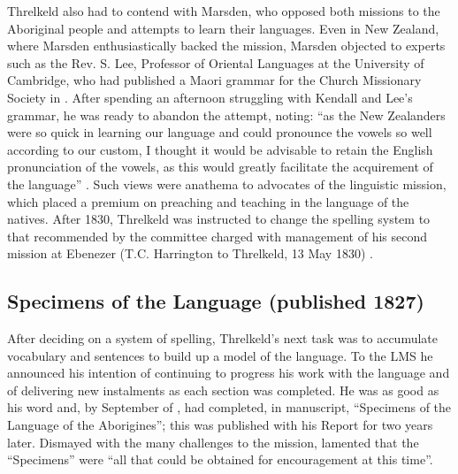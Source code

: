 {Threlkeld also had to contend with Marsden, who opposed both missions to the Aboriginal people and attempts to learn their languages. Even in New Zealand, where Marsden enthusiastically backed the mission, Marsden objected to experts such as the Rev. S. Lee, Professor of Oriental Languages at the University of Cambridge, who had published a Maori grammar for the Church Missionary Society in \citeyear{lee_grammar_1820} \citep{lee_grammar_1820}. After spending an afternoon struggling with Kendall and Lee’s grammar, he was ready to abandon the attempt, noting: “as the New Zealanders were so quick in learning our language and could pronounce the vowels so well according to our custom, I thought it would be advisable to retain the English pronunciation of the vowels, as this would greatly facilitate the acquirement of the language” \citep[374]{elder_letters_1932}. Such views were anathema to advocates of the linguistic mission, which placed a premium on preaching and teaching in the language of the natives. After 1830, Threlkeld was instructed to change the spelling system to that recommended by the committee charged with management of his second mission at Ebenezer (T.C. Harrington to Threlkeld, 13 May 1830) \citep[252--253]{gunson_australian_1974b}.

\subsection{Specimens of the Language (published 1827)}

After deciding on a system of spelling, Threlkeld’s next task was to accumulate vocabulary and sentences to build up a model of the language. To the LMS he announced his intention of continuing to progress his work with the language and of delivering new instalments as each section was completed. He was as good as his word and, by September of \citeyear{threlkeld_orthography_1825}, had completed, in manuscript, “Specimens of the Language of the Aborigines”; this was published with his Report for \citeyear{threlkeld_specimens_1827} two years later. Dismayed with the many challenges to the mission, \citet{threlkeld_specimens_1827} lamented that the “Specimens” were “all that could be obtained for encouragement at this time”.

}

